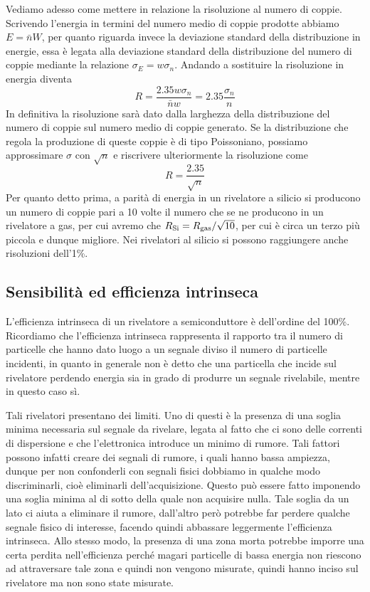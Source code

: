 Vediamo adesso come mettere in relazione la risoluzione al numero di coppie. Scrivendo l'energia in termini del numero medio di coppie prodotte abbiamo $E=\bar{n}W$, per quanto riguarda invece la deviazione standard della distribuzione in energie, essa è legata alla deviazione standard della distribuzione del numero di coppie mediante la relazione $\sigma_E=w \sigma_n$. Andando a sostituire la risoluzione in energia diventa
\begin{equation*}
   R
   =\frac{2.35w \sigma_n}{\bar{n} w}
   =2.35\frac{\sigma_n}{n}
\end{equation*}
In definitiva la risoluzione sarà dato dalla larghezza della distribuzione del numero di coppie sul numero medio di coppie generato. Se la distribuzione che regola la produzione di queste coppie è di tipo Poissoniano, possiamo approssimare $\sigma$ con $\sqrt{n}$ e riscrivere ulteriormente la risoluzione come
\begin{equation*}
   R=\frac{2.35}{\sqrt{n}}
\end{equation*}
Per quanto detto prima, a parità di energia in un rivelatore a silicio si producono un numero di coppie pari a 10 volte il numero che se ne producono in un rivelatore a gas, per cui avremo che $R_{\rm Si}=R_{\rm gas}/\sqrt{10}$, per cui è circa un terzo più piccola e dunque migliore.
Nei rivelatori al silicio si possono raggiungere anche risoluzioni dell'1\%.

\subsection{Sensibilità ed efficienza intrinseca}

L'efficienza intrinseca di un rivelatore a semiconduttore è dell'ordine del 100\%. Ricordiamo che l'efficienza intrinseca rappresenta il rapporto tra il numero di particelle che hanno dato luogo a un segnale diviso il numero di particelle incidenti, in quanto in generale non è detto che una particella che incide sul rivelatore perdendo energia sia in grado di produrre un segnale rivelabile, mentre in questo caso sì.

Tali rivelatori presentano dei limiti. Uno di questi è la presenza di una soglia minima necessaria sul segnale da rivelare, legata al fatto che ci sono delle correnti di dispersione e che l'elettronica introduce un minimo di rumore. Tali fattori possono infatti creare dei segnali di rumore, i quali hanno bassa ampiezza, dunque per non confonderli con segnali fisici dobbiamo in qualche modo discriminarli, cioè eliminarli dell'acquisizione. Questo può essere fatto imponendo una soglia minima al di sotto della quale non acquisire nulla. Tale soglia da un lato ci aiuta a eliminare il rumore, dall'altro però potrebbe far perdere qualche segnale fisico di interesse, facendo quindi abbassare leggermente l'efficienza intrinseca. Allo stesso modo, la presenza di una zona morta potrebbe imporre una certa perdita nell'efficienza perché magari particelle di bassa energia non riescono ad attraversare tale zona e quindi non vengono misurate, quindi hanno inciso sul rivelatore ma non sono state misurate.

